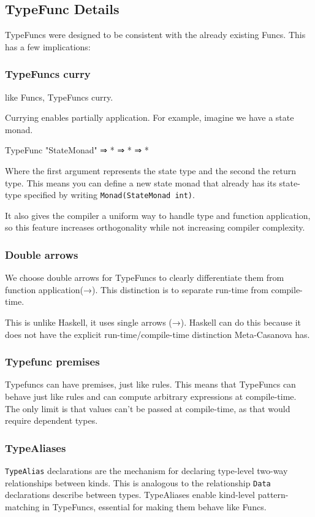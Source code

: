 \subsection{TypeFunc Details}
TypeFuncs were designed to be consistent with the already existing Funcs.
This has a few implications:

\subsubsection*{TypeFuncs curry}
like Funcs, TypeFuncs curry.

Currying enables partially application.
For example, imagine we have a state monad.

\begin{code}
  TypeFunc "StateMonad" ⇒ * ⇒ * ⇒ *
\end{code}

\noindent Where the first argument represents the state type and the second the return type.
This means you can define a new state monad that already has its state-type specified by writing \verb|Monad(StateMonad int)|.

It also gives the compiler a uniform way to handle type and function application,
so this feature increases orthogonality while not increasing compiler complexity.

\subsubsection*{Double arrows}
We choose double arrows for TypeFuncs to clearly differentiate them from function application(→).
This distinction is to separate run-time from compile-time.

This is unlike Haskell, it uses single arrows (→).
Haskell can do this because it does not have the explicit run-time/compile-time distinction Meta-Casanova has.

\subsubsection*{Typefunc premises}
Typefuncs can have premises, just like rules.
This means that TypeFuncs can behave just like rules and can compute arbitrary expressions at compile-time.
The only limit is that values can't be passed at compile-time, as that would require dependent types.

\subsubsection*{TypeAliases}
\texttt{TypeAlias} declarations are the mechanism for declaring type-level two-way relationships between kinds.
This is analogous to the relationship \texttt{Data} declarations describe between types.
TypeAliases enable kind-level pattern-matching in TypeFuncs, essential for making them behave like Funcs.
